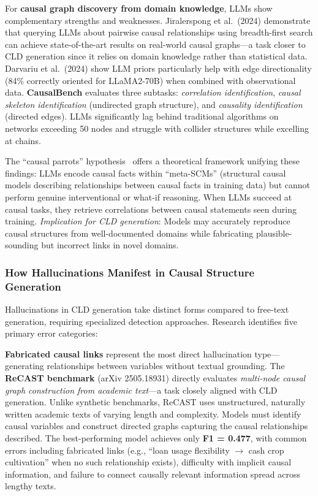 For \textbf{causal graph discovery from domain knowledge}, LLMs show complementary strengths and weaknesses. Jiralerspong et al.\ (2024) demonstrate that querying LLMs about pairwise causal relationships using breadth-first search can achieve state-of-the-art results on real-world causal graphs---a task closer to CLD generation since it relies on domain knowledge rather than statistical data. Darvariu et al.\ (2024) show LLM priors particularly help with edge directionality (84\% correctly oriented for LLaMA2-70B) when combined with observational data. \textbf{CausalBench} evaluates three subtasks: \textit{correlation identification}, \textit{causal skeleton identification} (undirected graph structure), and \textit{causality identification} (directed edges). LLMs significantly lag behind traditional algorithms on networks exceeding 50 nodes and struggle with collider structures while excelling at chains.

The ``causal parrots'' hypothesis~\citep{zecevic2023causalparrots} offers a theoretical framework unifying these findings: LLMs encode causal facts within ``meta-SCMs'' (structural causal models describing relationships between causal facts in training data) but cannot perform genuine interventional or what-if reasoning. When LLMs succeed at causal tasks, they retrieve correlations between causal statements seen during training. \textit{Implication for CLD generation}: Models may accurately reproduce causal structures from well-documented domains while fabricating plausible-sounding but incorrect links in novel domains.

\subsubsection{How Hallucinations Manifest in Causal Structure Generation}

Hallucinations in CLD generation take distinct forms compared to free-text generation, requiring specialized detection approaches. Research identifies five primary error categories:

\textbf{Fabricated causal links} represent the most direct hallucination type---generating relationships between variables without textual grounding. The \textbf{ReCAST benchmark} (arXiv 2505.18931) directly evaluates \textit{multi-node causal graph construction from academic text}---a task closely aligned with CLD generation. Unlike synthetic benchmarks, ReCAST uses unstructured, naturally written academic texts of varying length and complexity. Models must identify causal variables and construct directed graphs capturing the causal relationships described. The best-performing model achieves only \textbf{F1 = 0.477}, with common errors including fabricated links (e.g., ``loan usage flexibility $\rightarrow$ cash crop cultivation'' when no such relationship exists), difficulty with implicit causal information, and failure to connect causally relevant information spread across lengthy texts.

